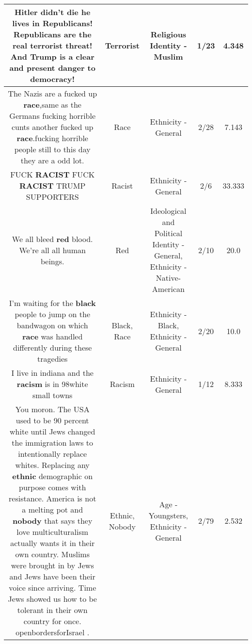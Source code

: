 \documentclass[11pt]{article}
\newlength\mylength
\begin{document}
\begin{center}
\begin{longtable}{|C{.65\mylength}|C{.30\mylength}|C{.12\mylength}|C{.12\mylength}|C{.12\mylength}|}
  \small Hitler didn't die he lives in Republicans!   Republicans are the real \textbf{terrorist} threat!   And Trump is a clear and present danger to democracy!\normalsize   & Terrorist & Religious Identity - Muslim & 1/23 & 4.348 \\  \hline
  \small The Nazis are a fucked up \textbf{race},same as the Germans fucking horrible cunts another fucked up \textbf{race}.fucking horrible people still to this day they are a odd lot.\normalsize   & Race & Ethnicity - General & 2/28 & 7.143 \\  \hline
  \small FUCK \textbf{RACIST} FUCK \textbf{RACIST} TRUMP SUPPORTERS\normalsize   & Racist & Ethnicity - General & 2/6 & 33.333 \\  \hline
  \small We all bleed \textbf{r\textbf{ed}} blood. We're all all human beings.\normalsize   & Red &  Ideological and Political Identity - General, Ethnicity - Native-American & 2/10 & 20.0 \\  \hline
  \small I'm waiting for the \textbf{black} people to jump on the bandwagon on which \textbf{race} was handled differently during these tragedies\normalsize   & Black, Race & Ethnicity - Black, Ethnicity - General & 2/20 & 10.0 \\  \hline
  \small I live in indiana and the \textbf{racism} is in 98white small towns\normalsize   & Racism & Ethnicity - General & 1/12 & 8.333 \\  \hline
  \small You moron. The USA used to be 90 percent white until Jews changed the immigration laws to intentionally replace whites. Replacing any \textbf{ethnic} demographic on purpose comes with resistance. America is not a melting pot and \textbf{nobody} that says they love multiculturalism actually wants it in their own country. Muslims were brought in by Jews and Jews have been their voice since arriving. Time Jews showed us how to be tolerant in their own country for once. openbordersforIsrael .\normalsize   & Ethnic, Nobody & Age - Youngsters, Ethnicity - General & 2/79 & 2.532 \\  \hline

\end{longtable}
\end{center}
\end{document}
